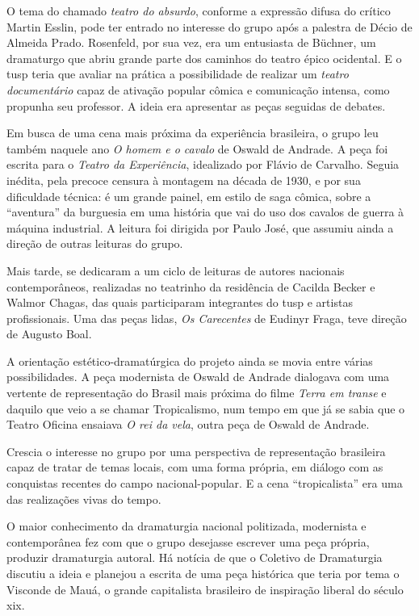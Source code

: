 O tema do chamado {\it teatro do absurdo}, conforme a expressão difusa
do crítico Martin Esslin, pode ter entrado no interesse do grupo após a
palestra de Décio de Almeida Prado. Rosenfeld, por sua vez, era um
entusiasta de Büchner, um dramaturgo que abriu grande parte dos caminhos
do teatro épico ocidental. E o {\sc tusp} teria que avaliar na prática a
possibilidade de realizar um {\it teatro documentário} capaz de ativação
popular cômica e comunicação intensa, como propunha seu professor. A
ideia era apresentar as peças seguidas de debates.

Em busca de uma cena mais próxima da experiência brasileira, o grupo leu
também naquele ano {\it O homem e o cavalo} de Oswald de Andrade. A peça
foi escrita para o {\it Teatro da Experiência}, idealizado por Flávio de
Carvalho. Seguia inédita, pela precoce censura à montagem na década de
1930, e por sua dificuldade técnica: é um grande painel, em estilo de
saga cômica, sobre a “aventura” da burguesia em uma história que vai do
uso dos cavalos de guerra à máquina industrial. A leitura foi dirigida
por Paulo José, que assumiu ainda a direção de outras leituras do grupo.

Mais tarde, se dedicaram a um ciclo de leituras de autores nacionais
contemporâneos, realizadas no teatrinho da residência de Cacilda Becker
e Walmor Chagas, das quais participaram integrantes do {\sc tusp} e artistas
profissionais. Uma das peças lidas, {\it Os Carecentes} de Eudinyr
Fraga, teve direção de Augusto Boal.

A orientação estético-dramatúrgica do projeto ainda se movia entre
várias possibilidades. A peça modernista de Oswald de Andrade dialogava
com uma vertente de representação do Brasil mais próxima do filme
{\it Terra em transe} e daquilo que veio a se chamar Tropicalismo, num
tempo em que já se sabia que o Teatro Oficina ensaiava {\it O rei da
vela}, outra peça de Oswald de Andrade.

Crescia o interesse no grupo por uma perspectiva de representação
brasileira capaz de tratar de temas locais, com uma forma própria, em
diálogo com as conquistas recentes do campo nacional-popular. E a cena
“tropicalista” era uma das realizações vivas do tempo.

O maior conhecimento da dramaturgia nacional politizada, modernista e
contemporânea fez com que o grupo desejasse escrever uma peça própria,
produzir dramaturgia autoral. Há notícia de que o Coletivo de
Dramaturgia discutiu a ideia e planejou a escrita de uma peça histórica
que teria por tema o Visconde de Mauá, o grande capitalista brasileiro
de inspiração liberal do século {\sc xix}.

